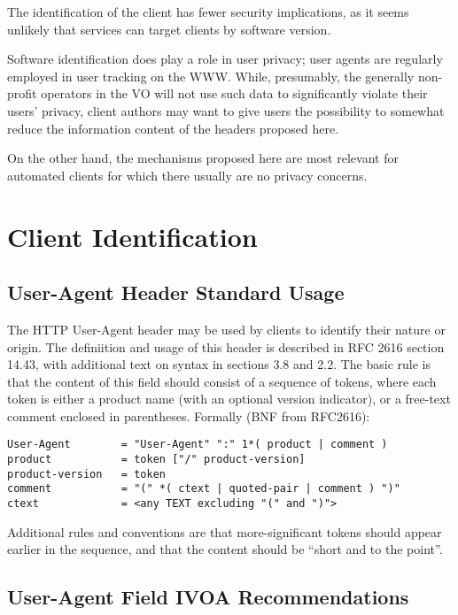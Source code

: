 \documentclass[11pt,a4paper]{ivoa}
\begin{document}
The identification of the client has fewer security implications, as it
seems unlikely that services can target clients by software version.

Software identification does play a role in user privacy; user agents
are regularly employed in user tracking on the WWW.  While, presumably,
the generally non-profit operators in the VO will not use such data to
significantly violate their users' privacy, client authors may want to
give users the possibility to somewhat reduce the information content of
the headers proposed here.

On the other hand, the mechanisms proposed here are most relevant for
automated clients for which there usually are no privacy concerns.


\section{Client Identification}

\subsection{User-Agent Header Standard Usage}

The HTTP User-Agent header may be used by clients to identify their
nature or origin. The definiition and usage of this header is described
in RFC 2616 \citep{std:HTTP} section 14.43, with additional text on
syntax in sections 3.8 and 2.2. The basic rule is that the content of
this field should consist of a sequence of tokens, where each token is
either a product name (with an optional version indicator), or a
free-text comment enclosed in parentheses. Formally (BNF from RFC2616):

\begin{lstlisting}
User-Agent        = "User-Agent" ":" 1*( product | comment )
product           = token ["/" product-version]
product-version   = token
comment           = "(" *( ctext | quoted-pair | comment ) ")"
ctext             = <any TEXT excluding "(" and ")">
\end{lstlisting}

Additional rules and conventions are that more-significant tokens should
appear earlier in the sequence, and that the content should be ``short
and to the point''.

\subsection{User-Agent Field IVOA Recommendations}
\end{document}
